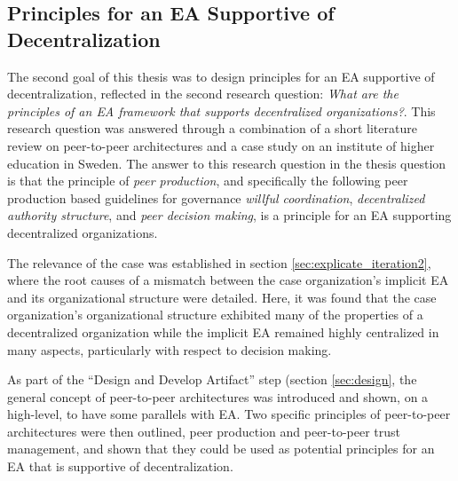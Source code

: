 \subsection{Principles for an EA Supportive of Decentralization}

The second goal of this thesis was to design principles for an EA supportive of decentralization, reflected in the second research question: \textit{What are the principles of an EA framework that supports decentralized organizations?}.  This research question was answered through a combination of a short literature review on peer-to-peer architectures and a case study on an institute of higher education in Sweden. The answer to this research question in the thesis question is that the principle of \textit{peer production}, and specifically the following peer production based guidelines for governance \textit{willful coordination}, \textit{decentralized authority structure}, and \textit{peer decision making}, is a principle for an EA supporting decentralized organizations. 

The relevance of the case was established in section \ref{sec:explicate_iteration2}, where the root causes of a mismatch between the case organization's implicit EA and its organizational structure were detailed. Here, it was found that the case organization's organizational structure exhibited many of the properties of a decentralized organization while the implicit EA remained highly centralized in many aspects, particularly with respect to decision making. 

As part of the ``Design and Develop Artifact'' step (section \ref{sec:design}, the general concept of peer-to-peer architectures was introduced and shown, on a high-level, to have some parallels with EA. Two specific principles of peer-to-peer architectures were then outlined, peer production and peer-to-peer trust management, and shown that they could be used as potential principles for an EA that is supportive of decentralization. 

